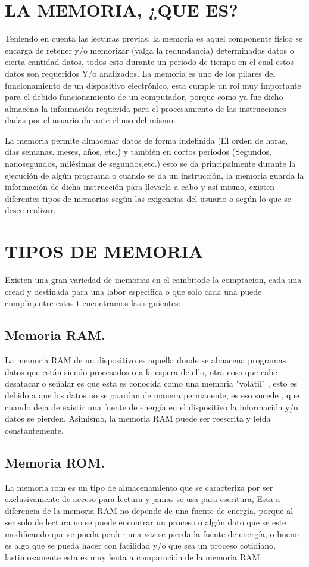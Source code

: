 \documentclass{article}
\begin{document}
\newpage
\section{LA MEMORIA, ¿QUE ES?}
{\raggedright
Teniendo en cuenta las lecturas previas,  la memoria es aquel componente físico  se encarga de retener y/o memorizar (valga la redundancia) determinados datos o cierta cantidad datos, todos esto durante un periodo de tiempo en el cual estos datos son requeridos Y/o analizados. La memoria es uno de los  pilares del funcionamiento de un dispositivo electrónico, esta  cumple un rol muy importante para el debido funcionamiento  de un computador, porque como ya fue dicho almacena la información requerida para el procesamiento de las instrucciones dadas por el usuario durante el uso del mismo.

La memoria permite almacenar datos de forma indefinida (El orden de horas, días semanas. meses, años, etc.) y también en cortos periodos (Segundos, nanosegundos, milésimas de segundos,etc.) esto se da principalmente durante la ejecución de algún programa o cuando se da un instrucción, la memoria guarda la información de dicha instrucción para llevarla a cabo y así mismo, existen diferentes tipos de memorias según las exigencias del usuario o según lo que se desee realizar.

\section{TIPOS DE MEMORIA} 

Existen una gran variedad de memorias  en el cambitode la comptacion, cada una cread y destinada para una labor especifica o que solo cada una puede cumplir,entre estas t encontramos las siguientes: \cite{Augusto}
\subsection{Memoria RAM.}
La memoria RAM  de un dispositivo  es aquella donde se almacena programas datos que están siendo procesados o a la espera de ello, otra cosa que cabe desatacar o señalar es que  esta es conocida como una  memoria "volátil" , esto es debido a que los datos no se guardan de manera permanente, es eso sucede , que cuando deja de existir una fuente de energía en el dispositivo la información y/o datos se pierden. Asimismo, la memoria RAM puede ser reescrita y leída constantemente. \cite{RAM}


\subsection{Memoria ROM.}
La memoria rom es un tipo de almacenamiento que se caracteriza por ser exclusivamente de acceso para lectura y jamas se usa para escritura, Esta a diferencia de la memoria RAM no depende de una fuente de energía, porque al ser solo de lectura no se puede encontrar un proceso o algún dato que se este modificando que se pueda perder una vez se pierda la fuente de energía, o bueno es algo que se pueda hacer con facilidad y/o que sea un proceso cotidiano, lastimosamente esta es muy lenta a comparación de la memoria RAM. \cite{ROM}

}
\end{document}
